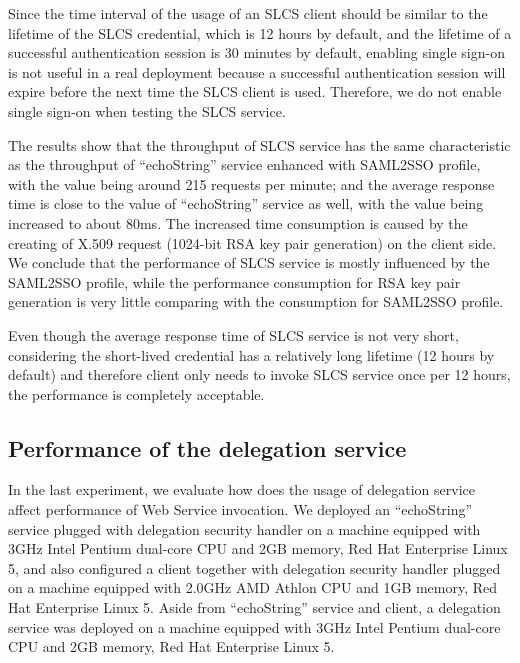 \documentclass[conference]{IEEEtran}
\begin{document}
Since the time interval of the usage of an SLCS client should be similar to the lifetime of the SLCS
credential, which is 12 hours by default, and the lifetime of a successful authentication session is 
30 minutes by default, enabling single sign-on is not useful in a real deployment because a successful 
authentication session will expire before the next time the SLCS client is used. Therefore, 
we do not enable single sign-on when testing the SLCS service.

The results show that the throughput of SLCS service has the same characteristic
as the throughput of ``echoString'' service enhanced with SAML2SSO profile, with the value being
around 215 requests per minute; and the average response time is close to the value of
``echoString'' service as well, with the value being increased to about 80ms. The increased time
consumption is caused by the creating of X.509 request (1024-bit RSA key pair generation) on the client
side. We conclude that the performance of SLCS service is mostly influenced by the SAML2SSO profile,
while the performance consumption for RSA key pair generation is very little comparing with the 
consumption for SAML2SSO profile.

Even though the average response time of SLCS service is not very short,
considering the short-lived credential has a relatively long lifetime (12 hours by default) and therefore
client only needs to invoke SLCS service once per 12 hours, the performance is completely acceptable.

\subsection{Performance of the delegation service}
\label{sec:perfdelegserv}

In the last experiment, we evaluate how does the usage of delegation service
affect performance of Web Service invocation. We deployed an ``echoString'' service
plugged with delegation security handler on a machine equipped with 3GHz Intel Pentium dual-core CPU and
2GB memory, Red Hat Enterprise Linux 5, and also configured a client together with delegation
security handler plugged on a machine equipped with 2.0GHz AMD Athlon CPU and 1GB memory, Red Hat
Enterprise Linux 5. Aside from ``echoString'' service and client, a delegation service was deployed on a machine
equipped with 3GHz Intel Pentium dual-core CPU and 2GB memory, Red Hat Enterprise Linux 5.
\end{document}

